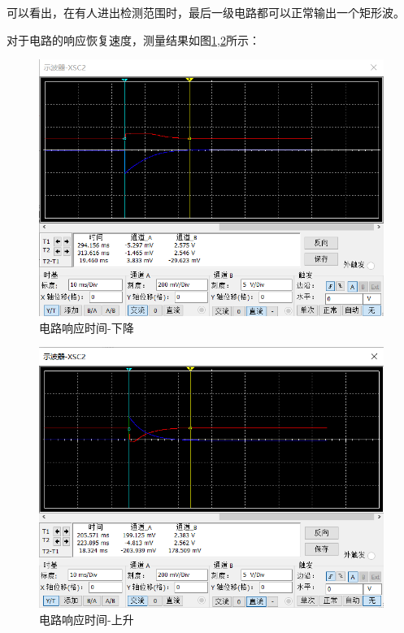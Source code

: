 \documentclass{article}
\begin{document}
\begin{spacing}{1.5}
    可以看出，在有人进出检测范围时，最后一级电路都可以正常输出一个矩形波。

    对于电路的响应恢复速度，测量结果如图\ref{fig:sim4_result7},\ref{fig:sim4_result6}所示：

    \begin{figure}[H]
        \centering
        \includegraphics[scale=0.4]{fig/sim/sim4_result7.png}
        \caption{电路响应时间-下降}
        \label{fig:sim4_result7}
    \end{figure}
    
    \begin{figure}[H]
        \centering
        \includegraphics[scale=0.4]{fig/sim/sim4_result6.png}
        \caption{电路响应时间-上升}
        \label{fig:sim4_result6}
    \end{figure}
    

\end{spacing}
\end{document}
